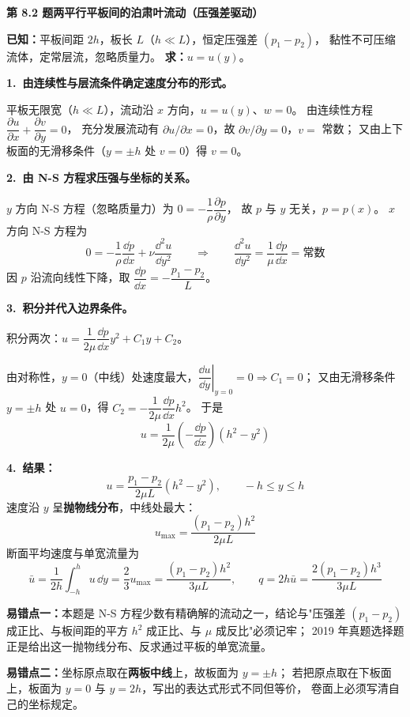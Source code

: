 \noindent\textbf{第 8.2 题\quad 两平行平板间的泊肃叶流动（压强差驱动）}

\begin{jie}
\textbf{已知：}平板间距 $2h$，板长 $L$（$h\ll L$），恒定压强差 $(p_1-p_2)$，
黏性不可压缩流体，定常层流，忽略质量力。
\textbf{求：}$u=u(y)$。

\textbf{1.\ 由连续性与层流条件确定速度分布的形式。}

平板无限宽（$h\ll L$），流动沿 $x$ 方向，$u=u(y)$、$w=0$。
由连续性方程 $\dfrac{\partial u}{\partial x}+\dfrac{\partial v}{\partial y}=0$，
充分发展流动有 $\partial u/\partial x=0$，故 $\partial v/\partial y=0$，$v=$ 常数；
又由上下板面的无滑移条件（$y=\pm h$ 处 $v=0$）得 $v=0$。

\textbf{2.\ 由 N-S 方程求压强与坐标的关系。}

$y$ 方向 N-S 方程（忽略质量力）为 $0=-\dfrac{1}{\rho}\dfrac{\partial p}{\partial y}$，
故 $p$ 与 $y$ 无关，$p=p(x)$。
$x$ 方向 N-S 方程为
\[
0=-\frac{1}{\rho}\frac{\dd p}{\dd x}+\nu\frac{\dd^2u}{\dd y^2}
\qquad\Longrightarrow\qquad
\frac{\dd^2u}{\dd y^2}=\frac{1}{\mu}\frac{\dd p}{\dd x}=\text{常数}
\]
因 $p$ 沿流向线性下降，取 $\dfrac{\dd p}{\dd x}=-\dfrac{p_1-p_2}{L}$。

\textbf{3.\ 积分并代入边界条件。}

积分两次：$u=\dfrac{1}{2\mu}\dfrac{\dd p}{\dd x}y^2+C_1y+C_2$。

由对称性，$y=0$（中线）处速度最大，$\left.\dfrac{\dd u}{\dd y}\right|_{y=0}=0\Rightarrow C_1=0$；
又由无滑移条件 $y=\pm h$ 处 $u=0$，得 $C_2=-\dfrac{1}{2\mu}\dfrac{\dd p}{\dd x}h^2$。
于是
\[
u=\frac{1}{2\mu}\left(-\frac{\dd p}{\dd x}\right)\left(h^2-y^2\right)
\]

\textbf{4.\ 结果：}
\[
\boxed{\,u=\frac{p_1-p_2}{2\mu L}\left(h^2-y^2\right),\qquad -h\le y\le h\,}
\]
速度沿 $y$ 呈\textbf{抛物线分布}，中线处最大：
\[
u_{\max}=\frac{(p_1-p_2)h^2}{2\mu L}
\]
断面平均速度与单宽流量为
\[
\bar u=\frac{1}{2h}\int_{-h}^{h}u\,\dd y=\frac{2}{3}u_{\max}=\frac{(p_1-p_2)h^2}{3\mu L},
\qquad
q=2h\bar u=\frac{2(p_1-p_2)h^3}{3\mu L}
\]
\end{jie}

\begin{yicuo}
\textbf{易错点一：}本题是 N-S 方程少数有精确解的流动之一，结论与"压强差
$(p_1-p_2)$ 成正比、与板间距的平方 $h^2$ 成正比、与 $\mu$ 成反比"必须记牢；
2019 年真题选择题正是给出这一抛物线分布、反求通过平板的单宽流量。

\textbf{易错点二：}坐标原点取在\textbf{两板中线}上，故板面为 $y=\pm h$；
若把原点取在下板面上，板面为 $y=0$ 与 $y=2h$，写出的表达式形式不同但等价，
卷面上必须写清自己的坐标规定。
\end{yicuo}

